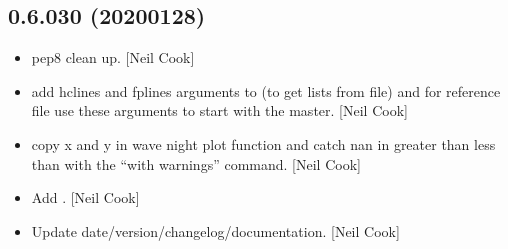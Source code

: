 \documentclass[a4paper,10pt,english]{report}
\begin{document}
\subsection{0.6.030 (2020\sphinxhyphen{}01\sphinxhyphen{}28)}
\label{\detokenize{misc/changelog:id7}}\begin{itemize}
\item {} 
 \sphinxhyphen{} pep8 clean up. {[}Neil Cook{]}

\item {} 
 \sphinxhyphen{} add hclines and fplines arguments to
 (to get lists from file) and for reference file use
these arguments to start with the master. {[}Neil Cook{]}

\item {} 
 \sphinxhyphen{} copy x and y in wave night plot function
and catch nan in greater than less than with the “with warnings”
command. {[}Neil Cook{]}

\item {} 
Add . {[}Neil Cook{]}

\item {} 
Update date/version/changelog/documentation. {[}Neil Cook{]}

\end{itemize}
\end{document}
